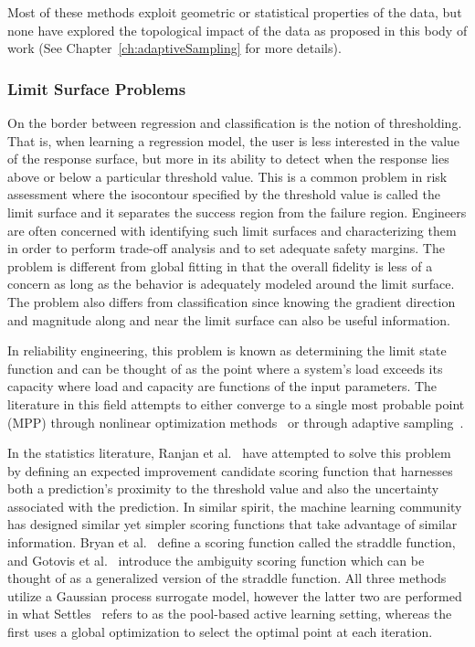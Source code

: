 Most of these methods exploit geometric or statistical properties of the data, but none have explored the topological impact of the data as proposed in this body of work (See Chapter~\ref{ch:adaptiveSampling} for more details).

\subsubsection{Limit Surface Problems}
\label{sec:limitSurface}

On the border between regression and classification is the notion of thresholding.
%
That is, when learning a regression model, the user is less interested in the value of the response surface, but more in its ability to detect when the response lies above or below a particular threshold value.
%
This is a common problem in risk assessment where the isocontour specified by the threshold value is called the limit surface and it separates the success region from the failure region.
%
Engineers are often concerned with identifying such limit surfaces and characterizing them in order to perform trade-off analysis and to set adequate safety margins.
%
The problem is different from global fitting in that the overall fidelity is less of a concern as long as the behavior is adequately modeled around the limit surface.
%
The problem also differs from classification since knowing the gradient direction and magnitude along and near the limit surface can also be useful information.

In reliability engineering, this problem is known as determining the limit state function and can be thought of as the point where a system's load exceeds its capacity where load and capacity are functions of the input parameters.
%
The literature in this field attempts to either converge to a single most probable point (MPP) through nonlinear optimization methods~\cite{EldredBichon2006,EldredAgarwalPerez2007} or through adaptive sampling~\cite{Wu1994,DeyMahadevan1998,ZouMahadevanMourelatos2002,BichonEldredSwiler2008}.

In the statistics literature, Ranjan et al.~\cite{RanjanBinghamMichailidis2008} have attempted to solve this problem by defining an expected improvement candidate scoring function that harnesses both a prediction's proximity to the threshold value and also the uncertainty associated with the prediction.
%
In similar spirit, the machine learning community has designed similar yet simpler scoring functions that take advantage of similar information.
%
Bryan et al.~\cite{BryanSchneiderNichol2005} define a scoring function called the straddle function, and Gotovis et al.~\cite{GotovosCasatiHitz2013} introduce the ambiguity scoring function which can be thought of as a generalized version of the straddle function.
%
All three methods utilize a Gaussian process surrogate model, however the latter two are performed in what Settles~\cite{Settles2009} refers to as the pool-based active learning setting, whereas the first uses a global optimization to select the optimal point at each iteration.


